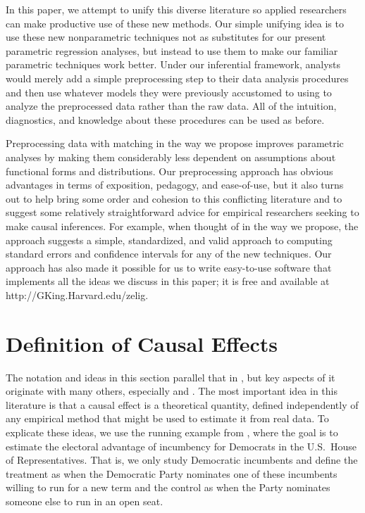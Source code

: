 \documentclass[11pt,titlepage]{article}
\begin{document}
In this paper, we attempt to unify this diverse literature so applied
researchers can make productive use of these new methods.  Our simple
unifying idea is to use these new nonparametric techniques not as
substitutes for our present parametric regression analyses, but
instead to use them to make our familiar parametric techniques work
better.  Under our inferential framework, analysts would merely add a
simple preprocessing step to their data analysis procedures and then
use whatever models they were previously accustomed to using to
analyze the preprocessed data rather than the raw data.  All of the
intuition, diagnostics, and knowledge about these procedures can be
used as before.  

Preprocessing data with matching in the way we propose improves
parametric analyses by making them considerably less dependent on
assumptions about functional forms and distributions.  Our
preprocessing approach has obvious advantages in terms of exposition,
pedagogy, and ease-of-use, but it also turns out to help bring some
order and cohesion to this conflicting literature and to suggest some
relatively straightforward advice for empirical researchers seeking to
make causal inferences.  For example, when thought of in the way we
propose, the approach suggests a simple, standardized, and valid
approach to computing standard errors and confidence intervals for any
of the new techniques.  Our approach has also made it possible for us
to write easy-to-use software that implements all the ideas we discuss
in this paper; it is free and available at
http://GKing.Harvard.edu/zelig.

\section{Definition of Causal Effects}

The notation and ideas in this section parallel that in
\citet[][Section 3.1.1]{KinKeoVer94}, but key aspects of it originate
with many others, especially \citet{Rubin74} and \citet{Holland86}.
The most important idea in this literature is that a causal effect is
a theoretical quantity, defined independently of any empirical method
that might be used to estimate it from real data.  To explicate these
ideas, we use the running example from \citet[][Section
3.1.1]{KinKeoVer94}, where the goal is to estimate the electoral
advantage of incumbency for Democrats in the U.S.\ House of
Representatives.  That is, we only study Democratic incumbents and
define the treatment as when the Democratic Party nominates one of
these incumbents willing to run for a new term and the control as when
the Party nominates someone else to run in an open seat.
\end{document}
